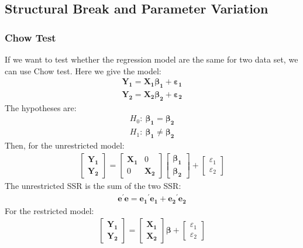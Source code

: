 \documentclass{article}
\begin{document}
\subsection{Structural Break and Parameter Variation}
\subsubsection{Chow Test}
If we want to test whether the regression model are the same for two data set, we can use Chow test. Here we give the model:
	\begin{align*}
		\boldsymbol{Y_1} = \boldsymbol{X_1}\boldsymbol{\beta_1} + \boldsymbol{\varepsilon_1}\\
		\boldsymbol{Y_2} = \boldsymbol{X_2}\boldsymbol{\beta_2} + \boldsymbol{\varepsilon_2}
	\end{align*}
The hypotheses are:
	\begin{align*}
		H_0:\ \boldsymbol{\beta_1} = \boldsymbol{\beta_2}\\
		H_1:\ \boldsymbol{\beta_1} \neq \boldsymbol{\beta_2}
	\end{align*}
Then, for the unrestricted model:
	\begin{align*}
		\begin{bmatrix}
			\boldsymbol{Y_1}\\
			\boldsymbol{Y_2}
		\end{bmatrix} = 
		\begin{bmatrix}
			\boldsymbol{X_1} & 0\\
			0 & \boldsymbol{X_2}
		\end{bmatrix}
		\begin{bmatrix}
			\boldsymbol{\beta_1}\\
			\boldsymbol{\beta_2}
		\end{bmatrix} + 
		\begin{bmatrix}
			\varepsilon_1\\
			\varepsilon_2
		\end{bmatrix}
	\end{align*}
The unrestricted SSR is the sum of the two SSR:
	\begin{align*}
		\boldsymbol{e}^\prime \boldsymbol{e} = \boldsymbol{e_1}^\prime\boldsymbol{e_1} + \boldsymbol{e_2}^\prime\boldsymbol{e_2}
	\end{align*}
For the restricted model:
	\begin{align*}
		\begin{bmatrix}
			\boldsymbol{Y_1}\\
			\boldsymbol{Y_2}
		\end{bmatrix} = 
		\begin{bmatrix}
			\boldsymbol{X_1}\\
			\boldsymbol{X_2}
		\end{bmatrix} \boldsymbol{\beta} + 
		\begin{bmatrix}
			\varepsilon_1\\
			\varepsilon_2
		\end{bmatrix}
	\end{align*}
\end{document}

